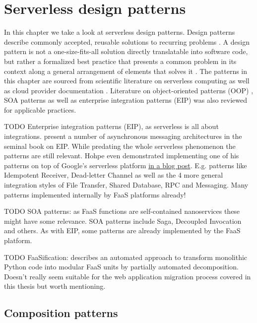 \chapter{Serverless design patterns} \label{cha:patterns}

In this chapter we take a look at serverless design patterns. Design patterns describe commonly accepted, reusable solutions to recurring problems \parencite{hohpe2004enterprise}. A design pattern is not a one-size-fits-all solution directly translatable into software code, but rather a formalized best practice that presents a common problem in its context along a general arrangement of elements that solves it \parencite{gamma94designPatterns}. The patterns in this chapter are sourced from scientific literature on serverless computing as well as cloud provider documentation \parencite[][]{aws18serverlessLens, microsoft18cloudPatterns}. Literature on object-oriented patterns (OOP) \parencite{gamma94designPatterns}, SOA patterns \parencite{rotem12soa} as well as enterprise integration patterns (EIP) \parencite{hohpe2004enterprise} was also reviewed for applicable practices.

TODO Enterprise integration patterns (EIP), as serverless is all about integrations. \textcite{hohpe2004enterprise} present a number of asynchronous messaging architectures in the seminal book on EIP. While predating the whole serverless phenomenon the patterns are still relevant. Hohpe even demonstrated implementing one of his patterns on top of Google's serverless platform \href{http://www.enterpriseintegrationpatterns.com/ramblings/google_cloud_functions.html}{in a blog post}. E.g. patterns like Idempotent Receiver, Dead-letter Channel as well as the 4 more general integration styles of File Transfer, Shared Database, RPC and Messaging. Many patterns implemented internally by FaaS platforms already!

TODO SOA patterns: as FaaS functions are self-contained nanoservices these might have some relevance. SOA patterns \parencite{rotem12soa} include Saga, Decoupled Invocation and others. As with EIP, some patterns are already implemented by the FaaS platform.

TODO FaaSification: \textcite{spillner17transformpython} describes an automated approach to transform monolithic Python code into modular FaaS units by partially automated decomposition. Doesn't really seem suitable for the web application migration process covered in this thesis but worth mentioning.

\section{Composition patterns} \label{sec:compositionPatterns}

